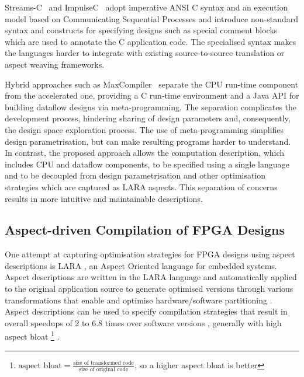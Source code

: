 Streams-C~\cite{Gokhale:Stone:Arnold:Kalinowski:2000} and
ImpulseC~\cite{ImpulseC} adopt imperative ANSI C syntax and an
execution model based on Communicating Sequential Processes and
introduce non-standard syntax and constructs for specifying designs
such as special comment blocks which are used to annotate the C
application code. The specialised syntax makes the languages harder to
integrate with existing source-to-source translation or aspect weaving
frameworks.

Hybrid approaches such as MaxCompiler~\cite{5719584} separate the CPU
run-time component from the accelerated one, providing a C run-time
environment and a Java API for building dataflow designs via
meta-programming. The separation complicates the development process,
hindering sharing of design parameters and, consequently, the design
space exploration process. The use of meta-programming simplifies
design parametrisation, but can make resulting programs harder to
understand. In contrast, the proposed approach allows the computation
description, which includes CPU and dataflow components, to be specified
using a single language and to be decoupled from design
parametrisation and other optimisation strategies which are captured
as LARA aspects. This separation of concerns results in more intuitive
and maintainable descriptions.


\subsection{Aspect-driven Compilation of FPGA Designs}

One attempt at capturing optimisation strategies for FPGA designs
using aspect descriptions is LARA
\cite{Cardoso:Carvalho:Cutinho:Luk:Nobre:Diniz:Petrov:2012,
  Cardoso:Carvalho:Teixeira:Diniz:Goncalves:Petrov:2012}, an Aspect
Oriented language for embedded systems. Aspect descriptions are
written in the LARA language and automatically applied to the
original application source to generate optimised versions through
various transformations that enable and optimise hardware/software
partitioning \cite{Lam:Coutinho:Luk:2008}. Aspect descriptions can be
used to specify compilation strategies that result in overall
speedups of 2 to 6.8 times over software versions
\cite{Cardoso:Teixeira:Alves:Nobre:Diniz:Cutinho:Luk:2012}, generally
with high aspect bloat \footnote{ $\text{aspect bloat} =
  \frac{\text{size of transformed code}}{\text{size of original
      code}}$, so a higher aspect bloat is better}
\cite{Cardoso:Carvalho:Cutinho:Luk:Nobre:Diniz:Petrov:2012}.

